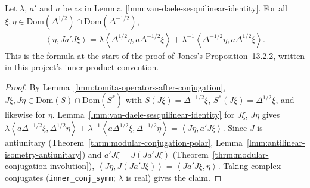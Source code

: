 \begin{corollary}
    \label{crllr:van-daele-rearranged-identity}
    \leanok
    Let $\lambda$, $a'$ and $a$ be as in Lemma~\ref{lmm:van-daele-sesquilinear-identity}. For all $\xi, \eta \in \text{Dom}(\Delta^{1/2}) \cap \text{Dom}(\Delta^{-1/2})$,
    \begin{align}
        \left< \eta, Ja'J\xi \right> = \lambda\left< \Delta^{1/2}\eta, a\Delta^{-1/2}\xi \right> + \lambda^{-1}\left< \Delta^{-1/2}\eta, a\Delta^{1/2}\xi \right>.
    \end{align}
    This is the formula at the start of the proof of Jones's Proposition~13.2.2, written in this project's inner product convention.
\end{corollary}
\begin{proof}
    \leanok
    By Lemma~\ref{lmm:tomita-operators-after-conjugation}, $J\xi, J\eta \in \text{Dom}(S) \cap \text{Dom}(S^*)$ with $S(J\xi) = \Delta^{-1/2}\xi$, $S^*(J\xi) = \Delta^{1/2}\xi$, and likewise for $\eta$. Lemma~\ref{lmm:van-daele-sesquilinear-identity} for $J\xi$, $J\eta$ gives $\lambda\left< a\Delta^{-1/2}\xi, \Delta^{1/2}\eta \right> + \lambda^{-1}\left< a\Delta^{1/2}\xi, \Delta^{-1/2}\eta \right> = \left< J\eta, a'J\xi \right>$. Since $J$ is antiunitary (Theorem~\ref{thrm:modular-conjugation-polar}, Lemma~\ref{lmm:antilinear-isometry-antiunitary}) and $a'J\xi = J(Ja'J\xi)$ (Theorem~\ref{thrm:modular-conjugation-involution}), $\left< J\eta, J(Ja'J\xi) \right> = \left< Ja'J\xi, \eta \right>$. Taking complex conjugates (\texttt{inner\_conj\_symm}; $\lambda$ is real) gives the claim.
\end{proof}

